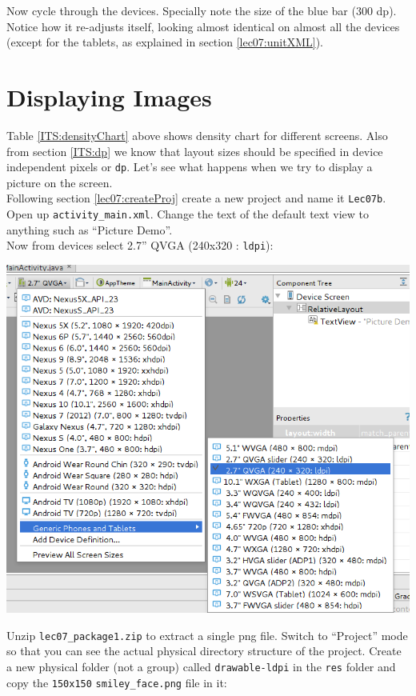 Now cycle through the devices. Specially note the size of the blue bar (300 dp). Notice how it re-adjusts itself, looking almost identical on almost all the devices (except for the tablets, as explained in section \ref{lec07:unitXML}).

\section{Displaying Images}
\label{ITS:displayImages}
Table \ref{ITS:densityChart} above shows density chart for different screens. Also from section \ref{ITS:dp} we know that layout sizes should be specified in device independent pixels or \texttt{dp}. Let's see what happens when we try to display a picture on the screen.\\

Following section \ref{lec07:createProj} create a new project and name it \texttt{Lec07b}. Open up \texttt{activity\_main.xml}. Change the text of the default text view to anything such as ``Picture Demo''. \\

Now from devices select 2.7'' QVGA (240x320 : \texttt{ldpi}):

\begin{center}
	\includegraphics[scale=0.4]{chapters/ch06/images/7}
\end{center}

Unzip \texttt{lec07\_package1.zip} to extract a single png file. Switch to ``Project'' mode so that you can see the actual physical directory structure of the project. Create a new physical folder (not a group) called \texttt{drawable-ldpi} in the \texttt{res} folder and copy the \texttt{150x150} \texttt{smiley\_face.png} file in it:

